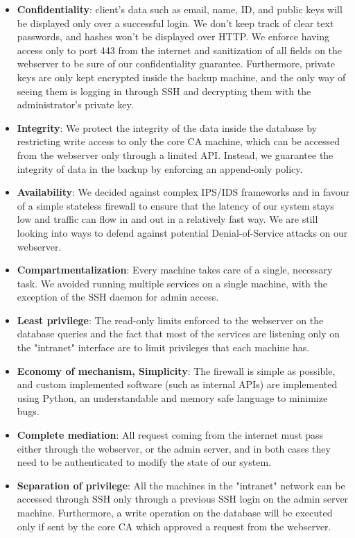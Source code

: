 \documentclass[english]{article}
\begin{document}
\begin{itemize}
	\item \textbf{Confidentiality}: client's data such as email, name, ID, and public keys will be displayed only over a successful login. We don't keep track of clear text passwords, and hashes won't be displayed over HTTP. We enforce having access only to port 443 from the internet and sanitization of all fields on the webserver to be sure of our confidentiality guarantee. Furthermore, private keys are only kept encrypted inside the backup machine, and the only way of seeing them is logging in through SSH and decrypting them with the administrator's private key.
	\item \textbf{Integrity}: We protect the integrity of the data inside the database by restricting write access to only the core CA machine, which can be accessed from the webserver only through a limited API. Instead, we guarantee the integrity of data in the backup by enforcing an append-only policy.
	\item \textbf{Availability}: We decided against complex IPS/IDS frameworks and in favour of a simple stateless firewall to ensure that the latency of our system stays low and traffic can flow in and out in a relatively fast way. We are still looking into ways to defend against potential Denial-of-Service attacks on our webserver.
	\item \textbf{Compartmentalization}: Every machine takes care of a single, necessary task. We avoided running multiple services on a single machine, with the exception of the SSH daemon for admin access.
	\item \textbf{Least privilege}: The read-only limits enforced to the webserver on the database queries and the fact that most of the services are listening only on the "intranet" interface are to limit privileges that each machine has.
	\item \textbf{Economy of mechanism, Simplicity}: The firewall is simple as possible, and custom implemented software (such as internal APIs) are implemented using Python, an understandable and memory safe language to minimize bugs.
	\item \textbf{Complete mediation}: All request coming from the internet must pass either through the webserver, or the admin server, and in both cases they need to be authenticated to modify the state of our system.
	\item \textbf{Separation of privilege}: All the machines in the "intranet" network can be accessed through SSH only through a previous SSH login on the admin server machine. Furthermore, a write operation on the database will be executed only if sent by the core CA which approved a request from the webserver.
\end{itemize}
\end{document}
